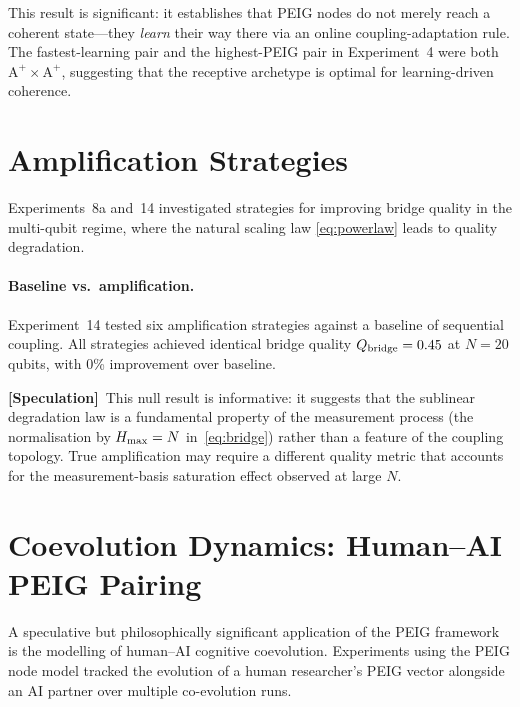 \documentclass[12pt]{article}
\newcommand{\speculation}{\textbf{[Speculation]}}
\newcommand{\Alpha}{\mathrm{A}}
\begin{document}
This result is significant: it establishes that PEIG nodes do not merely
reach a coherent state---they \emph{learn} their way there via an
online coupling-adaptation rule.  The fastest-learning pair and the
highest-PEIG pair in Experiment~4 were both $\Alpha^+ \times \Alpha^+$,
suggesting that the receptive archetype is optimal for learning-driven
coherence.

\section{Amplification Strategies}
\label{sec:amplification}

Experiments~8a and~14 investigated strategies for improving bridge
quality in the multi-qubit regime, where the natural scaling law
\eqref{eq:powerlaw} leads to quality degradation.

\paragraph{Baseline vs.\ amplification.}
Experiment~14 tested six amplification strategies against a baseline
of sequential coupling.  All strategies achieved identical bridge
quality $Q_{\rm bridge} = 0.45$ at $N = 20$ qubits, with 0\%
improvement over baseline.

\speculation\ This null result is informative: it suggests that the
sublinear degradation law is a fundamental property of the measurement
process (the normalisation by $H_{\rm max} = N$ in~\eqref{eq:bridge})
rather than a feature of the coupling topology.  True amplification
may require a different quality metric that accounts for the
measurement-basis saturation effect observed at large $N$.

\section{Coevolution Dynamics: Human--AI PEIG Pairing}
\label{sec:coevolution}

A speculative but philosophically significant application of the PEIG
framework is the modelling of human--AI cognitive coevolution.
Experiments using the PEIG node model tracked the evolution of a
human researcher's PEIG vector alongside an AI partner over multiple
co-evolution runs.
\end{document}
